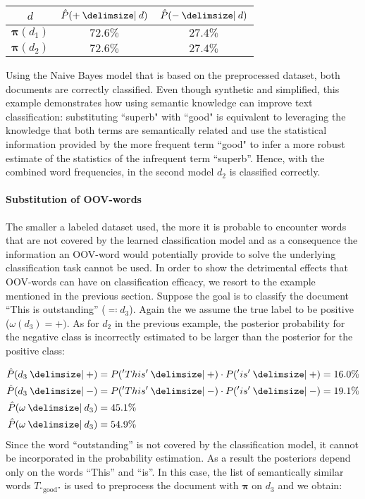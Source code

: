 \begin{center}
\begin{tabular}{c|c|c}
$d$ & $\hat{P}(+ \given d)$ & $\hat{P}(- \given d)$ \\
\hline
$\boldsymbol \pi(d_1)$ & $72.6 \%$ & $27.4 \%$ \\
$\boldsymbol \pi(d_2)$ & $72.6 \%$ & $27.4 \%$ \\
\end{tabular}
\end{center}

Using the Naive Bayes model that is based on the preprocessed dataset, both
documents are correctly classified. Even though synthetic and simplified, this
example demonstrates how using semantic knowledge can improve text
classification: substituting ``superb" with ``good" is
equivalent to leveraging the knowledge that both terms are semantically related and use
the statistical information provided by the more frequent term
``good" to infer a more robust estimate of the statistics of the infrequent term ``superb''.
Hence, with the combined word frequencies, in the second model $d_2$ is
classified correctly.

\paragraph{Substitution of OOV-words}
The smaller a labeled dataset used, the more it is probable to encounter words
that are not covered by the learned classification model and as a consequence
the information an OOV-word would potentially provide to solve the underlying
classification task cannot be used. In order to show the detrimental effects that OOV-words can
have on classification efficacy, we resort to the example mentioned in the
previous section. Suppose the goal is to classify the document ``This is
outstanding'' ($\eqqcolon d_3$). Again the we assume the true label to be positive
($\omega(d_3) = +)$. As for $d_2$ in the previous example, the
posterior probability for the negative class is incorrectly estimated to be
larger than the posterior for the positive class:

\begin{equation*}
\begin{split}
	\hat{P}(d_3 \given +) &=  P('This' \given +) \cdot P('is' \given +) = 16.0 \%
	\\
	\hat{P}(d_3 \given -) &=  P('This' \given -) \cdot P('is' \given -) = 19.1 \%
	\\
	\hat{P}(\omega \given d_3) &= 45.1 \% \\
	\hat{P}(\omega \given d_3) &= 54.9 \%	
\end{split}
\end{equation*}
Since the word ``outstanding'' is not covered by the classification model, it
cannot be incorporated in the probability estimation. As a result the
posteriors depend only on the words ``This'' and ``is''.
In this case, the list of semantically similar words
$T_{\text{``good''}}$ is used to preprocess the document
with $\boldsymbol \pi$ on $d_3$ and we obtain:

